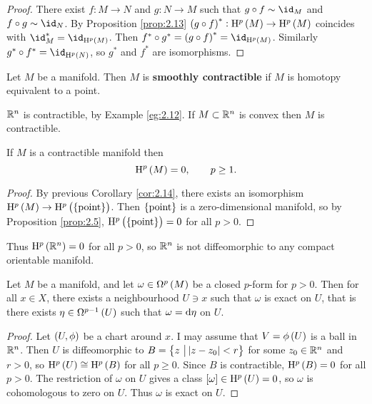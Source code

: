 \begin{proof}
There exist $ f : M \to N $ and $ g : N \to M $ such that $ g \circ f \sim \id_M $ and $ f \circ g \sim \id_N $. By Proposition \ref{prop:2.13} $ \br{g \circ f}^* : \H^p\br{M} \to \H^p\br{M} $ coincides with $ \id_M^* = \id_{\H^p\br{M}} $. Then $ f^* \circ g^* = \br{g \circ f}^* = \id_{\H^p\br{M}} $. Similarly $ g^* \circ f^* = \id_{\H^p\br{N}} $, so $ g^* $ and $ f^* $ are isomorphisms.
\end{proof}

\begin{definition}
Let $ M $ be a manifold. Then $ M $ is \textbf{smoothly contractible} if $ M $ is homotopy equivalent to a point.
\end{definition}

\begin{example*}
$ \mathbb{R}^n $ is contractible, by Example \ref{eg:2.12}. If $ M \subset \mathbb{R}^n $ is convex then $ M $ is contractible.
\end{example*}

\begin{theorem}
If $ M $ is a contractible manifold then
$$ \H^p\br{M} = 0, \qquad p \ge 1. $$
\end{theorem}

\begin{proof}
By previous Corollary \ref{cor:2.14}, there exists an isomorphism $ \H^p\br{M} \to \H^p\br{\cbr{\text{point}}} $. Then $ \cbr{\text{point}} $ is a zero-dimensional manifold, so by Proposition \ref{prop:2.5}, $ \H^p\br{\cbr{\text{point}}} = 0 $ for all $ p > 0 $.
\end{proof}

Thus $ \H^p\br{\RR^n} = 0 $ for all $ p > 0 $, so $ \mathbb{R}^n $ is not diffeomorphic to any compact orientable manifold.


\begin{proposition}
Let $ M $ be a manifold, and let $ \omega \in \Omega^p\br{M} $ be a closed $ p $-form for $ p > 0 $. Then for all $ x \in X $, there exists a neighbourhood $ U \ni x $ such that $ \omega $ is exact on $ U $, that is there exists $ \eta \in \Omega^{p - 1}\br{U} $ such that $ \omega = \mathrm{d}\eta $ on $ U $.
\end{proposition}

\begin{proof}
Let $ \br{U, \phi} $ be a chart around $ x $. I may assume that $ V = \phi\br{U} $ is a ball in $ \mathbb{R}^n $. Then $ U $ is diffeomorphic to $ B = \cbr{z \st \abs{z - z_0} < r} $ for some $ z_0 \in \mathbb{R}^n $ and $ r > 0 $, so $ \H^p\br{U} \cong \H^p\br{B} $ for all $ p \ge 0 $. Since $ B $ is contractible, $ \H^p\br{B} = 0 $ for all $ p > 0 $. The restriction of $ \omega $ on $ U $ gives a class $ \sbr{\omega} \in \H^p\br{U} = 0 $, so $ \omega $ is cohomologous to zero on $ U $. Thus $ \omega $ is exact on $ U $.
\end{proof}

